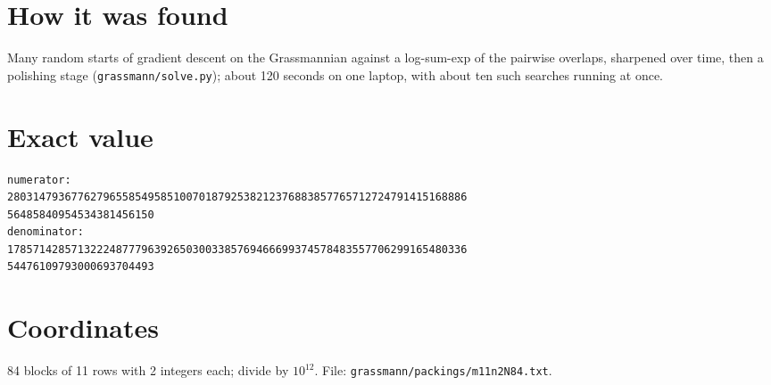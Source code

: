 \documentclass[11pt,a4paper]{article}
\begin{document}
\section{How it was found}
Many random starts of gradient descent on the Grassmannian against a log-sum-exp of the pairwise overlaps, sharpened over time, then a polishing stage (\texttt{grassmann/solve.py}); about 120 seconds on one laptop, with about ten such searches running at once.


\appendix
\section{Exact value}
{\small
\begin{verbatim}
numerator:
280314793677627965585495851007018792538212376883857765712724791415168886
56485840954534381456150
denominator:
178571428571322248777963926503003385769466699374578483557706299165480336
54476109793000693704493
\end{verbatim}}

\section{Coordinates}
84 blocks of 11 rows with 2 integers each; divide by $10^{12}$. File: \texttt{grassmann/packings/m11n2N84.txt}.
{\tiny
\begin{multicols}{4}
\end{multicols}}
\end{document}
